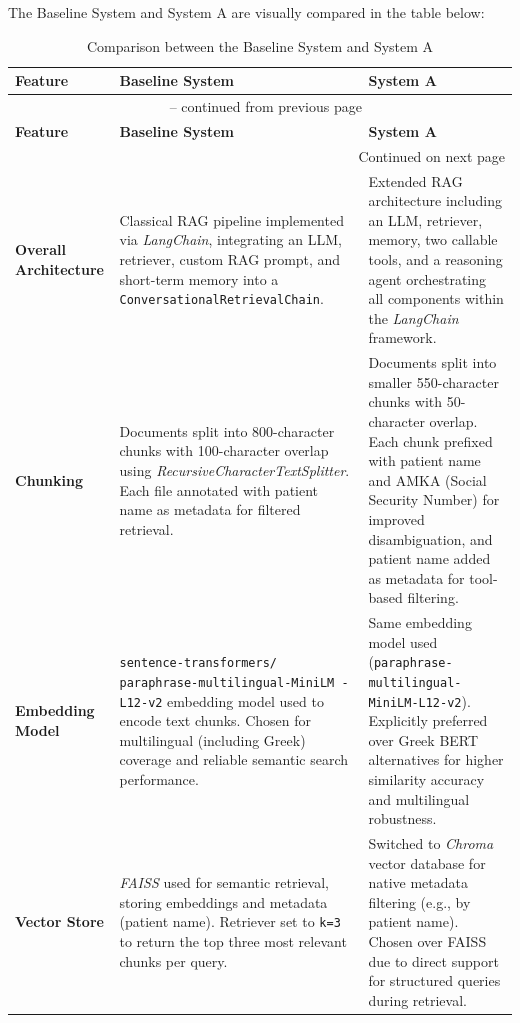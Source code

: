 The Baseline System and System A are visually compared in the table below:

\renewcommand{\arraystretch}{1.3}

\begin{longtable}{|p{3cm}|p{6.5cm}|p{6.5cm}|}
\caption{Comparison between the Baseline System and System A} \\
\hline
\textbf{Feature} & \textbf{Baseline System} & \textbf{System A} \\
\hline
\endfirsthead
\multicolumn{3}{c}{{\tablename\ \thetable{} -- continued from previous page}} \\
\hline
\textbf{Feature} & \textbf{Baseline System} & \textbf{System A} \\
\hline
\endhead
\hline \multicolumn{3}{r}{{Continued on next page}} \\
\endfoot
\hline
\endlastfoot

\textbf{Overall Architecture} &
Classical RAG pipeline implemented via \textit{LangChain}, integrating an LLM, retriever, custom RAG prompt, and short-term memory into a \texttt{ConversationalRetrievalChain}. &
Extended RAG architecture including an LLM, retriever, memory, two callable tools, and a reasoning agent orchestrating all components within the \textit{LangChain} framework. \\
\hline

\textbf{Chunking} &
Documents split into 800-character chunks with 100-character overlap using \textit{RecursiveCharacterTextSplitter}.  
Each file annotated with patient name as metadata for filtered retrieval. &
Documents split into smaller 550-character chunks with 50-character overlap.  
Each chunk prefixed with patient name and AMKA (Social Security Number) for improved disambiguation, and patient name added as metadata for tool-based filtering. \\
\hline

\textbf{Embedding Model} &
\texttt{sentence-transformers/
paraphrase-multilingual-MiniLM
-L12-v2} embedding model used to encode text chunks.  
Chosen for multilingual (including Greek) coverage and reliable semantic search performance. &
Same embedding model used (\texttt{paraphrase-multilingual-
MiniLM-L12-v2}).  
Explicitly preferred over Greek BERT alternatives for higher similarity accuracy and multilingual robustness. \\
\hline

\textbf{Vector Store} &
\textit{FAISS} used for semantic retrieval, storing embeddings and metadata (patient name).  
Retriever set to \texttt{k=3} to return the top three most relevant chunks per query. &
Switched to \textit{Chroma} vector database for native metadata filtering (e.g., by patient name).  
Chosen over FAISS due to direct support for structured queries during retrieval. \\
\hline


\end{longtable}

